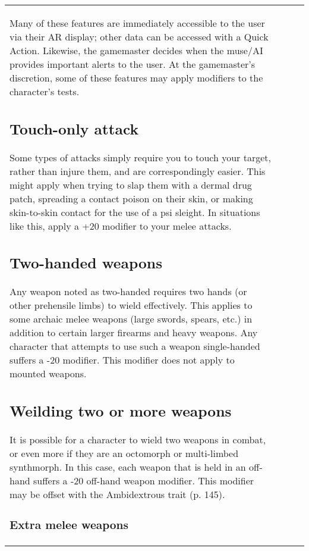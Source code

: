 \begin{table}
\begin{tabular}{|p{8cm}|r|r|r|}
Many of these features are immediately accessible to the user via their AR display; other data can be accessed with a Quick Action. Likewise, the gamemaster decides when the muse/AI provides important alerts to the user. At the gamemaster’s discretion, some of these features may apply modifiers to the character’s tests. 



\subsection{Touch-only attack} \label{sec:touch-only-attack} Some types of attacks simply require you to touch your target, rather than injure them, and are correspondingly easier. This might apply when trying to slap them with a dermal drug patch, spreading a contact poison on their skin, or making skin-to-skin contact for the use of a psi sleight. In situations like this, apply a +20 modifier to your melee attacks. 



\subsection{Two-handed weapons} \label{sec:two-handed-weapons} 

Any weapon noted as two-handed requires two hands (or other prehensile limbs) to wield effectively. This applies to some archaic melee weapons (large swords, spears, etc.) in addition to certain larger firearms and heavy weapons. Any character that attempts to use such a weapon single-handed suffers a -20 modifier. This modifier does not apply to mounted weapons. 



\subsection{Weilding two or more weapons} \label{sec:weilding-two-or-more} 

It is possible for a character to wield two weapons in combat, or even more if they are an octomorph or multi-limbed synthmorph. In this case, each weapon that is held in an off-hand suffers a -20 off-hand weapon modifier. This modifier may be offset with the Ambidextrous trait (p. 145). 

\subsubsection{Extra melee weapons} 


\end{tabular}
\end{table}
